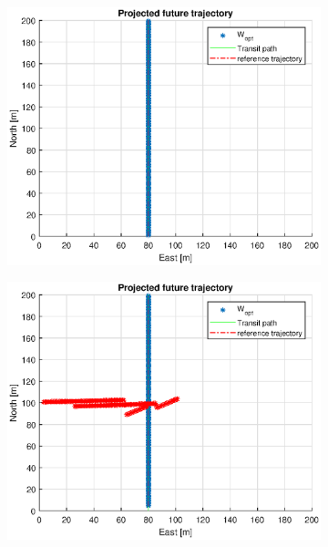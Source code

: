 \begin{figure} %
    \begin{subfigure}[b]{0.49\textwidth}
        \centering
        \includegraphics[width=\textwidth]{Images/Figures/sving_GW/Simple0_f999_Frame1}
    \end{subfigure}
    \hfill
    \begin{subfigure}[b]{0.499\textwidth}
        \centering
        \includegraphics[width=\textwidth]{Images/Figures/sving_GW/Simple0_f999_Frame2}

\end{subfigure}
\end{figure}
